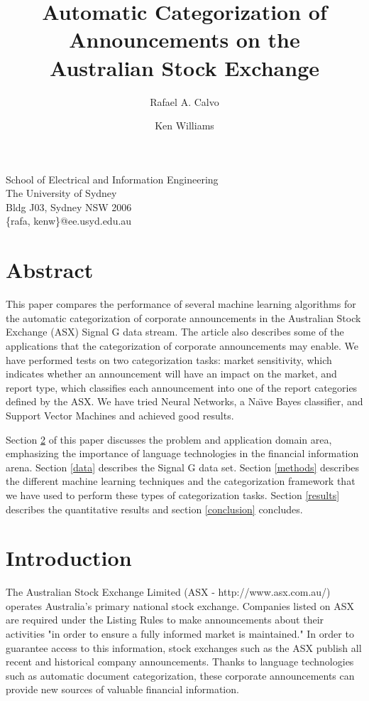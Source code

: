 \documentclass[a4paper,twocolumn]{article}
\author{Rafael A. Calvo \and Ken Williams}
\title{Automatic Categorization of Announcements on the\\ Australian Stock Exchange}
\begin{document}
\maketitle

\begin{center}
School of Electrical and Information Engineering\\
The University of Sydney\\
Bldg J03, Sydney NSW 2006\\
\{rafa, kenw\}@ee.usyd.edu.au

\end{center}

\section{Abstract}

This paper compares the performance of several machine learning algorithms for the automatic categorization of corporate announcements in the Australian Stock Exchange (ASX) Signal G data stream. The article also describes some of the applications that the categorization of corporate announcements may enable. We have performed tests on two categorization tasks: market sensitivity, which indicates whether an announcement will have an impact on the market, and report type, which classifies each announcement into one of the report categories defined by the ASX. We have tried Neural Networks, a Na\"\i ve Bayes classifier, and Support Vector Machines and achieved good results.

Section \ref{introduction} of this paper discusses the problem and application domain area, emphasizing the importance of language technologies in the financial information arena. Section \ref{data} describes the Signal G data set.  Section \ref{methods} describes the different machine learning techniques and the categorization framework that we have used to perform these types of categorization tasks. Section \ref{results} describes the quantitative results and section \ref{conclusion} concludes.

\section{Introduction}
\label{introduction}

The Australian Stock Exchange Limited (ASX - http://www.asx.com.au/) operates Australia's primary national stock exchange.  Companies listed on ASX are required under the Listing Rules to make announcements about their activities "in order to ensure a fully informed market is maintained." \cite{asx:02} In order to guarantee access to this information, stock exchanges such as the ASX publish all recent and historical company announcements.  Thanks to language technologies such as automatic document categorization, these corporate announcements can provide new sources of valuable financial information.
\end{document}

